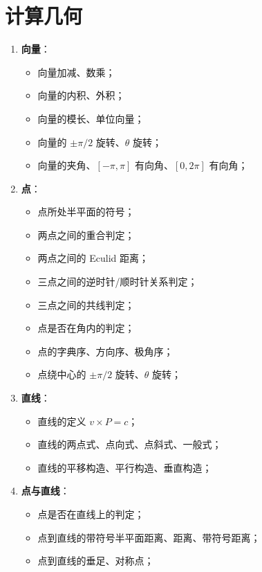 \section{计算几何}

\begin{enumerate}[noitemsep]
    \item {\bf 向量}：
    \begin{itemize}[noitemsep]
        \item 向量加减、数乘；
        \item 向量的内积、外积；
        \item 向量的模长、单位向量；
        \item 向量的 $\pm \pi / 2$ 旋转、$\theta$ 旋转；
        \item 向量的夹角、$[-\pi, \pi]$ 有向角、$[0, 2\pi]$ 有向角；
    \end{itemize}
    \item {\bf 点}：
    \begin{itemize}[noitemsep]
        \item 点所处半平面的符号；
        \item 两点之间的重合判定；
        \item 两点之间的 Eculid 距离；
        \item 三点之间的逆时针/顺时针关系判定；
        \item 三点之间的共线判定；
        \item 点是否在角内的判定；
        \item 点的字典序、方向序、极角序；
        \item 点绕中心的 $\pm \pi / 2$ 旋转、$\theta$ 旋转；
    \end{itemize}
    \item {\bf 直线}：
    \begin{itemize}[noitemsep]
        \item 直线的定义 $v \times P = c$；
        \item 直线的两点式、点向式、点斜式、一般式；
        \item 直线的平移构造、平行构造、垂直构造；
    \end{itemize}
    \item {\bf 点与直线}：
    \begin{itemize}[noitemsep]
        \item 点是否在直线上的判定；
        \item 点到直线的带符号半平面距离、距离、带符号距离；
        \item 点到直线的垂足、对称点；

\end{itemize}
\end{enumerate}
